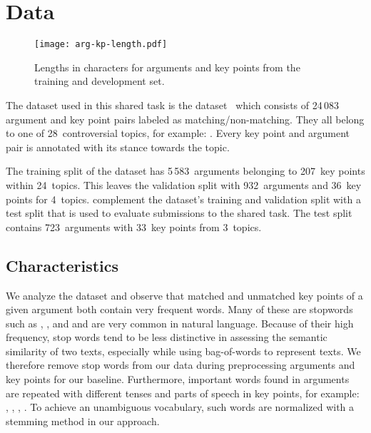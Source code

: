 \section{Data}\label{data}

\begin{figure*}
    \centering
    \texttt{[image: arg-kp-length.pdf]}
    \caption{Lengths in characters for arguments and key points from the training and development set.}
    \label{arg-kp-length}
\end{figure*}

The dataset used in this shared task is the \ArgKP dataset~\cite{Bar-HaimEFKLS2020} which consists of 24\,083 argument 
and key point pairs labeled as matching/non-matching. They all belong to one of 28~controversial topics, for example: 
. Every key point and argument pair is annotated with its stance towards the topic. 

The training split of the \ArgKP dataset has 5\,583~arguments belonging to 207~key points within 24~topics. This leaves the validation split with 932~arguments and 36~key points for 4~topics.
\citet{kpa-2021-overview} complement the \ArgKP dataset's training and validation split with a test split that is used to evaluate submissions to the shared task. The test split contains 723~arguments with 33~key points from 3~topics.

\subsection{Characteristics}

We analyze the \ArgKP dataset and observe that matched and unmatched key points of a given argument both contain very frequent words. 
Many of these are stopwords such as , , and  and are very common in natural language.
Because of their high frequency, stop words tend to be less distinctive in assessing the semantic similarity of two texts, especially while using bag-of-words to represent texts.
We therefore remove stop words from our data during preprocessing arguments and key points for our baseline. 
Furthermore, important words found in arguments are repeated with different tenses and parts of speech in key points, for example: 
, , , . 
To achieve an unambiguous vocabulary, such words are normalized with a stemming method in our approach.

